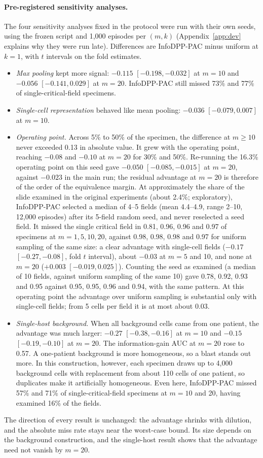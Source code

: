 \documentclass[11pt]{article}
\theoremstyle{remark}
\theoremstyle{definition}
\begin{document}
\paragraph{Pre-registered sensitivity analyses.} The four sensitivity analyses fixed in the protocol were run with their own seeds, using the frozen script and 1,000 episodes per $(m,k)$ (Appendix~\ref{app:dev} explains why they were run late). Differences are InfoDPP-PAC minus uniform at $k=1$, with $t$ intervals on the fold estimates.
\begin{itemize}
\item \emph{Max pooling} kept more signal: $-0.115$ $[-0.198,-0.032]$ at $m=10$ and $-0.056$ $[-0.141,0.029]$ at $m=20$. InfoDPP-PAC still missed 73\% and 77\% of single-critical-field specimens.
\item \emph{Single-cell representation} behaved like mean pooling: $-0.036$ $[-0.079,0.007]$ at $m=10$.
\item \emph{Operating point.} Across 5\% to 50\% of the specimen, the difference at $m\ge10$ never exceeded 0.13 in absolute value. It grew with the operating point, reaching $-0.08$ and $-0.10$ at $m=20$ for 30\% and 50\%. Re-running the 16.3\% operating point on this seed gave $-0.050$ $[-0.085,-0.015]$ at $m=20$, against $-0.023$ in the main run; the residual advantage at $m=20$ is therefore of the order of the equivalence margin. At approximately the share of the slide examined in the original experiments (about 2.4\%; exploratory), InfoDPP-PAC selected a median of 4--5 fields (mean 4.4--4.9, range 2--10, 12,000 episodes) after its 5-field random seed, and never reselected a seed field. It missed the single critical field in 0.81, 0.96, 0.96 and 0.97 of specimens at $m=1,5,10,20$, against 0.98, 0.98, 0.98 and 0.97 for uniform sampling of the same size: a clear advantage with single-cell fields ($-0.17$ $[-0.27,-0.08]$, fold $t$ interval), about $-0.03$ at $m=5$ and 10, and none at $m=20$ ($+0.003$ $[-0.019,0.025]$). Counting the seed as examined (a median of 10 fields, against uniform sampling of the same 10) gave 0.78, 0.92, 0.93 and 0.95 against 0.95, 0.95, 0.96 and 0.94, with the same pattern. At this operating point the advantage over uniform sampling is substantial only with single-cell fields; from 5 cells per field it is at most about 0.03.
\item \emph{Single-host background.} When all background cells came from one patient, the advantage was much larger: $-0.27$ $[-0.38,-0.16]$ at $m=10$ and $-0.15$ $[-0.19,-0.10]$ at $m=20$. The information-gain AUC at $m=20$ rose to 0.57. A one-patient background is more homogeneous, so a blast stands out more. In this construction, however, each specimen draws up to 4,000 background cells with replacement from about 110 cells of one patient, so duplicates make it artificially homogeneous. Even here, InfoDPP-PAC missed 57\% and 71\% of single-critical-field specimens at $m=10$ and 20, having examined 16\% of the fields.
\end{itemize}
The direction of every result is unchanged: the advantage shrinks with dilution, and the absolute miss rate stays near the worst-case bound. Its size depends on the background construction, and the single-host result shows that the advantage need not vanish by $m=20$.
\end{document}
